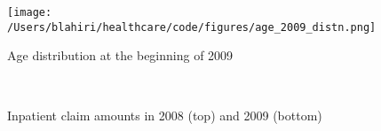 \begin{figure}[!h]
    \centering
    \texttt{[image: /Users/blahiri/healthcare/code/figures/age\_2009\_distn.png]}
    \caption{\small Age distribution at the beginning of 2009}
    \label{fig:age_2009}
\end{figure}

\begin{figure}[!h]
\centering
{}\\
\caption{\small Inpatient claim amounts in 2008 (top) and 2009 (bottom)}
\end{figure}

